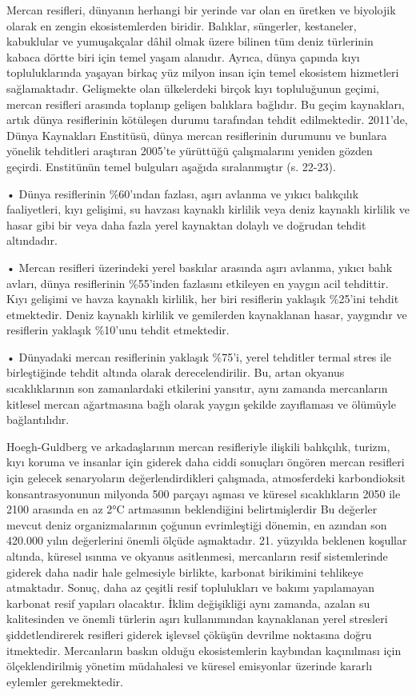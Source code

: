 \documentclass[
]{book}
\begin{document}
Mercan resifleri, dünyanın herhangi bir yerinde var olan en üretken ve biyolojik olarak en zengin ekosistemlerden biridir. Balıklar, süngerler, kestaneler, kabuklular ve yumuşakçalar dâhil olmak üzere bilinen tüm deniz türlerinin kabaca dörtte biri için temel yaşam alanıdır. Ayrıca, dünya çapında kıyı topluluklarında yaşayan birkaç yüz milyon insan için temel ekosistem hizmetleri sağlamaktadır. Gelişmekte olan ülkelerdeki birçok kıyı topluluğunun geçimi, mercan resifleri arasında toplanıp gelişen balıklara bağlıdır. Bu geçim kaynakları, artık dünya resiflerinin kötüleşen durumu tarafından tehdit edilmektedir. 2011'de, Dünya Kaynakları Enstitüsü, dünya mercan resiflerinin durumunu ve bunlara yönelik tehditleri araştıran 2005'te yürüttüğü çalışmalarını yeniden gözden geçirdi. Enstitünün temel bulguları aşağıda sıralanmıştır (s. 22-23). \citep{bush2020}

• Dünya resiflerinin \%60'ından fazlası, aşırı avlanma ve yıkıcı balıkçılık faaliyetleri, kıyı gelişimi, su havzası kaynaklı kirlilik veya deniz kaynaklı kirlilik ve hasar gibi bir veya daha fazla yerel kaynaktan dolaylı ve doğrudan tehdit altındadır.

• Mercan resifleri üzerindeki yerel baskılar arasında aşırı avlanma, yıkıcı balık avları, dünya resiflerinin \%55'inden fazlasını etkileyen en yaygın acil tehdittir. Kıyı gelişimi ve havza kaynaklı kirlilik, her biri resiflerin yaklaşık \%25'ini tehdit etmektedir. Deniz kaynaklı kirlilik ve gemilerden kaynaklanan hasar, yaygındır ve resiflerin yaklaşık \%10'unu tehdit etmektedir.

• Dünyadaki mercan resiflerinin yaklaşık \%75'i, yerel tehditler termal stres ile birleştiğinde tehdit altında olarak derecelendirilir. Bu, artan okyanus sıcaklıklarının son zamanlardaki etkilerini yansıtır, aynı zamanda mercanların kitlesel mercan ağartmasına bağlı olarak yaygın şekilde zayıflaması ve ölümüyle bağlantılıdır.

Hoegh-Guldberg ve arkadaşlarının mercan resifleriyle ilişkili balıkçılık, turizm, kıyı koruma ve insanlar için giderek daha ciddi sonuçları öngören mercan resifleri için gelecek senaryoların değerlendirdikleri çalışmada, atmosferdeki karbondioksit konsantrasyonunun milyonda 500 parçayı aşması ve küresel sıcaklıkların 2050 ile 2100 arasında en az 2°C artmasının beklendiğini belirtmişlerdir Bu değerler mevcut deniz organizmalarının çoğunun evrimleştiği dönemin, en azından son 420.000 yılın değerlerini önemli ölçüde aşmaktadır. 21. yüzyılda beklenen koşullar altında, küresel ısınma ve okyanus asitlenmesi, mercanların resif sistemlerinde giderek daha nadir hale gelmesiyle birlikte, karbonat birikimini tehlikeye atmaktadır. Sonuç, daha az çeşitli resif toplulukları ve bakımı yapılamayan karbonat resif yapıları olacaktır. İklim değişikliği aynı zamanda, azalan su kalitesinden ve önemli türlerin aşırı kullanımından kaynaklanan yerel stresleri şiddetlendirerek resifleri giderek işlevsel çöküşün devrilme noktasına doğru itmektedir. Mercanların baskın olduğu ekosistemlerin kaybından kaçınılması için ölçeklendirilmiş yönetim müdahalesi ve küresel emisyonlar üzerinde kararlı eylemler gerekmektedir. \citep{hoegh2007coral}
\end{document}
